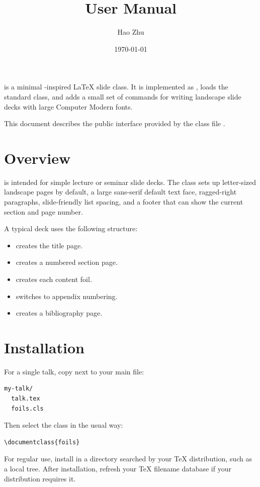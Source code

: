 \documentclass{article}
\title{\pkg{foils} User Manual}
\author{Hao Zhu}
\date{\today}
\begin{document}
\maketitle

 is a minimal -inspired LaTeX slide class.
It is implemented as , loads the standard  class, and adds a small set of commands for writing landscape slide decks with large Computer Modern fonts.

This document describes the public interface provided by the class file .

\section{Overview}
 is intended for simple lecture or seminar slide decks.
The class sets up letter-sized landscape pages by default, a large sans-serif default text face, ragged-right paragraphs, slide-friendly list spacing, and a footer that can show the current section and page number.

A typical deck uses the following structure:
\begin{itemize}
  \item {} creates the title page.
  \item {} creates a numbered section page.
  \item {} creates each content foil.
  \item {} switches to appendix numbering.
  \item {} creates a bibliography page.
\end{itemize}

\section{Installation}
For a single talk, copy  next to your main  file:
\begin{verbatim}
my-talk/
  talk.tex
  foils.cls
\end{verbatim}

Then select the class in the usual way:
\begin{verbatim}
\documentclass{foils}
\end{verbatim}

For regular use, install  in a directory searched by your TeX distribution, such as a local  tree.
After installation, refresh your TeX filename database if your distribution requires it.
\end{document}
